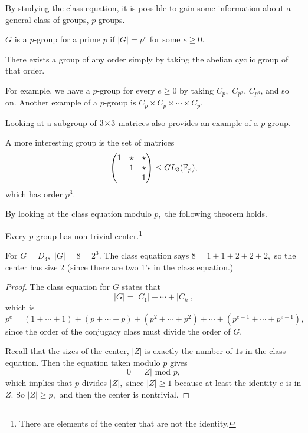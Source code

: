 By studying the class equation, it is possible to gain some information about a general class of groups, $p$-groups.

\begin{definition}
$G$ is a $p$-group for a prime $p$ if $|G| = p^e$ for some $e \geq 0.$
\end{definition} 

There exists a group of any order simply by taking the abelian cyclic group of that order.
\begin{example}
For example, we have a $p$-group for every $e \geq 0$ by taking $C_p,$ $C_{p^{2}}$, $C_{p^3}$, and so on. Another example of a $p$-group is $C_p \times C_p \times \cdots \times C_p$.
\end{example}

Looking at a subgroup of $3 \hspace{0.05em}{\times}\hspace{0.05em} 3$ matrices also provides an example of a $p$-group.
\begin{example}
A more interesting group is the set of matrices
\[\begin{pmatrix}
1 & \star & \star \\
 & 1 & \star \\
 & & 1
\end{pmatrix} \leq GL_3(\mathbb F_p),\]
which has order $p^3.$
\end{example}

By looking at the class equation modulo $p,$ the following theorem holds.

\begin{theorem}
Every $p$-group has non-trivial center.\footnote{There are elements of the center that are not the identity.}
\end{theorem}

\begin{example}
For $G = D_4,$ $|G| = 8 = 2^3.$ The class equation says $8 = 1 + 1 + 2 + 2 + 2,$ so the center has size 2 (since there are two 1's in the class equation.) %
\end{example}

\begin{proof}
The class equation for $G$ states that 
\[
|G| = |C_1| + \cdots + |C_k|,
\]
which is 
\[
p^e = (1 + \cdots + 1) + (p + \cdots + p) + (p^2 + \cdots + p^2) + \cdots + (p^{e-1} + \cdots + p^{e-1}),
\]
since the order of the conjugacy class must divide the order of $G.$

Recall that the sizes of the center, $|Z|$ is exactly the number of $1$s in the class equation. Then the equation taken modulo $p$ gives 
\[
0 = |Z| \text{ mod } p,
\]
which implies that $p$ divides $|Z|,$ since $|Z| \geq 1$ because at least the identity $e$ is in $Z.$ So $|Z| \geq p,$ and then the center is nontrivial.
\end{proof}

